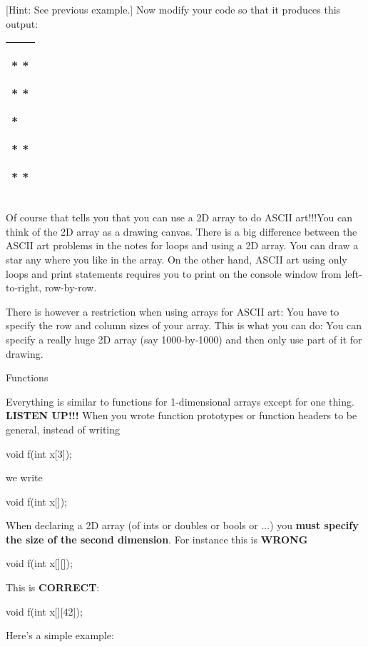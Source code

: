 \documentclass[
]{article}
\begin{document}
{[}Hint: See previous example.{]} Now modify your code so that it
produces this output:

\begin{longtable}[]{@{}l@{}}
\toprule
\endhead
\begin{minipage}[t]{0.97\columnwidth}\raggedright
* *

* *

*

* *

* *\strut
\end{minipage}\tabularnewline
\bottomrule
\end{longtable}

Of course that tells you that you can use a 2D array to do ASCII
art!!!You can think of the 2D array as a drawing canvas. There is a big
difference between the ASCII art problems in the notes for loops and
using a 2D array. You can draw a star any where you like in the array.
On the other hand, ASCII art using only loops and print statements
requires you to print on the console window from left-to-right,
row-by-row.

There is however a restriction when using arrays for ASCII art: You have
to specify the row and column sizes of your array. This is what you can
do: You can specify a really huge 2D array (say 1000-by-1000) and then
only use part of it for drawing.

Functions

Everything is similar to functions for 1-dimensional arrays except for
one thing. \textbf{LISTEN UP!!!} When you wrote function prototypes or
function headers to be general, instead of writing

void f(int x{[}3{]});

we write

void f(int x{[}{]});

When declaring a 2D array (of ints or doubles or bools or ...) you
\textbf{must specify the size of the second dimension}. For instance
this is \textbf{WRONG}

void f(int x{[}{]}{[}{]});

This is \textbf{CORRECT}:

void f(int x{[}{]}{[}42{]});

Here's a simple example:
\end{document}
